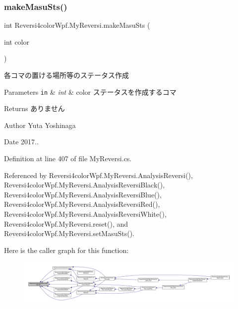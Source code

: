 \subsubsection{\texorpdfstring{make\+Masu\+Sts()}{makeMasuSts()}}
{\footnotesize\ttfamily int Reversi4color\+Wpf.\+My\+Reversi.\+make\+Masu\+Sts (\begin{DoxyParamCaption}\item[{int}]{color }\end{DoxyParamCaption})\hspace{0.3cm}{\ttfamily [private]}}



各コマの置ける場所等のステータス作成 


\begin{DoxyParams}[1]{Parameters}
\mbox{\tt in}  & {\em int} & color ステータスを作成するコマ \\
\hline
\end{DoxyParams}
\begin{DoxyReturn}{Returns}
ありません 
\end{DoxyReturn}
\begin{DoxyAuthor}{Author}
Yuta Yoshinaga 
\end{DoxyAuthor}
\begin{DoxyDate}{Date}
2017.. 
\end{DoxyDate}


Definition at line 407 of file My\+Reversi.\+cs.



Referenced by Reversi4color\+Wpf.\+My\+Reversi.\+Analysis\+Reversi(), Reversi4color\+Wpf.\+My\+Reversi.\+Analysis\+Reversi\+Black(), Reversi4color\+Wpf.\+My\+Reversi.\+Analysis\+Reversi\+Blue(), Reversi4color\+Wpf.\+My\+Reversi.\+Analysis\+Reversi\+Red(), Reversi4color\+Wpf.\+My\+Reversi.\+Analysis\+Reversi\+White(), Reversi4color\+Wpf.\+My\+Reversi.\+reset(), and Reversi4color\+Wpf.\+My\+Reversi.\+set\+Masu\+Sts().

Here is the caller graph for this function\+:
\nopagebreak
\begin{figure}[H]
\begin{center}
\leavevmode
\includegraphics[width=350pt]{class_reversi4color_wpf_1_1_my_reversi_aacb2634fe75f3290910033d13bd335aa_icgraph}
\end{center}
\end{figure}
\mbox{\label{class_reversi4color_wpf_1_1_my_reversi_af80d2c161f9734e13a6b37ca0ce852dc}} 
